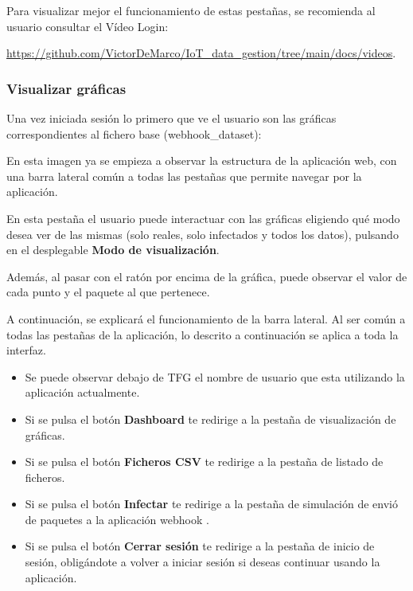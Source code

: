 Para visualizar mejor el funcionamiento de estas pestañas, se recomienda al usuario consultar el Vídeo Login:

\href{https://github.com/VictorDeMarco/IoT_data_gestion/tree/main/docs/videos}{https://github.com/VictorDeMarco/IoT\_data\_gestion/tree/main/docs/videos}.

\subsubsection{Visualizar gráficas}
Una vez iniciada sesión lo primero que ve el usuario son las gráficas correspondientes al fichero base (webhook\_dataset):



En esta imagen ya se empieza a observar la estructura de la aplicación web, con una barra lateral común a todas las pestañas que permite navegar por la aplicación.

En esta pestaña el usuario puede interactuar con las gráficas eligiendo qué modo desea ver de las mismas (solo reales, solo infectados y todos los datos), pulsando en el desplegable \textbf{Modo de visualización}. 

Además, al pasar con el ratón por encima de la gráfica, puede observar el valor de cada punto y el paquete al que pertenece.

A continuación, se explicará el funcionamiento de la barra lateral. Al ser común a todas las pestañas de la aplicación, lo descrito a continuación se aplica a toda la interfaz.

\begin{itemize}
    \item Se puede observar debajo de TFG el nombre de usuario que esta utilizando la aplicación actualmente.
    \item Si se pulsa el botón \textbf{Dashboard} te redirige a la pestaña de visualización de gráficas.
    \item Si se pulsa el botón \textbf{Ficheros CSV} te redirige a la pestaña de listado de ficheros.
    \item Si se pulsa el botón \textbf{Infectar} te redirige a la pestaña de simulación de envió de paquetes a la aplicación webhook .
    \item Si se pulsa el botón \textbf{Cerrar sesión} te redirige a la pestaña de inicio de sesión, obligándote a volver a iniciar sesión si deseas continuar usando la aplicación.
\end{itemize}

